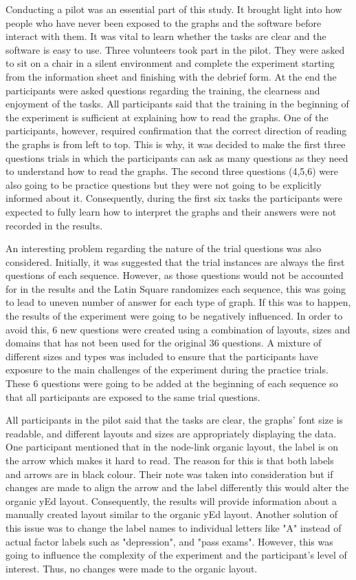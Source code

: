 \documentclass{l4proj}
\begin{document}
Conducting a pilot was an essential part of this study. It brought light into how people who have never been exposed to the graphs and the software before interact with them. It was vital to learn whether the tasks are clear and the software is easy to use. Three volunteers took part in the pilot. They were asked to sit on a chair in a silent environment and complete the experiment starting from the information sheet and finishing with the debrief form. At the end the participants were asked questions regarding the training, the clearness and enjoyment of the tasks. All participants said that the training in the beginning of the experiment is sufficient at explaining how to read the graphs. One of the participants, however, required confirmation that the correct direction of reading the graphs is from left to top. This is why, it was decided to make the first three questions trials in which the participants can ask as many questions as they need to understand how to read the graphs. The second three questions (4,5,6) were also going to be practice questions but they were not going to be explicitly informed about it. Consequently, during the first six tasks the participants were expected to fully learn how to interpret the graphs and their answers were not recorded in the results. 

An interesting problem regarding the nature of the trial questions was also considered. Initially, it was suggested that the trial instances are always the first questions of each sequence. However, as those questions would not be accounted for in the results and the Latin Square randomizes each sequence, this was going to lead to uneven number of answer for each type of graph. If this was to happen, the results of the experiment were going to be negatively influenced. In order to avoid this, 6 new questions were created using a combination of layouts, sizes and domains that has not been used for the original 36 questions. A mixture of different sizes and types was included to ensure that the participants have exposure to the main challenges of the experiment during the practice trials. These 6 questions were going to be added at the beginning of each sequence so that all participants are exposed to the same trial questions.  

All participants in the pilot said that the tasks are clear, the graphs' font size is readable, and different layouts and sizes are appropriately displaying the data. One participant mentioned that in the node-link organic layout, the label is on the arrow which makes it hard to read. The reason for this is that both labels and arrows are in black colour. Their note was taken into consideration but if changes are made to align the arrow and the label differently this would alter the organic yEd layout. Consequently, the results will provide information about a manually created layout similar to the organic yEd layout. Another solution of this issue was to change the label names to individual letters like "A" instead of actual factor labels such as "depression", and "pass exams". However, this was going to influence the complexity of the experiment and the participant's level of interest. Thus, no changes were made to the organic layout.
\end{document}
